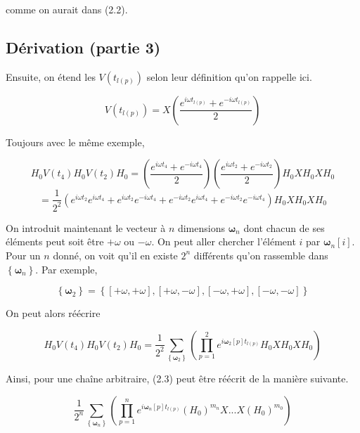 comme on aurait dans (2.2).

\subsection{Dérivation (partie 3)}
Ensuite, on étend les $V(t_{l(p)})$ selon leur définition qu'on rappelle ici.

\begin{equation*}
    V(t_{l(p)}) = X\left(\frac{e^{i\omega t_{l(p)}} + e^{-i\omega t_{l(p)}}}{2}\right)
\end{equation*}

Toujours avec le même exemple,

\begin{equation*}
    H_0V(t_4)H_0V(t_2)H_0 = \left(\frac{e^{i\omega t_4} + e^{-i\omega t_4}}{2}\right)\left(\frac{e^{i\omega t_2} + e^{-i\omega t_2}}{2}\right)H_0XH_0XH_0 
\end{equation*}
\begin{equation*}
    = \frac{1}{2^2}\left(e^{i\omega t_2}e^{i\omega t_4} + e^{i\omega t_2}e^{-i\omega t_4} + e^{-i\omega t_2}e^{i\omega t_4} + e^{-i\omega t_2}e^{-i\omega t_4}\right)H_0XH_0XH_0
\end{equation*}

On introduit maintenant le vecteur à $n$ dimensions $\boldsymbol{\omega}_n$ dont chacun de ses éléments peut soit être $+\omega$ ou $-\omega$. On peut aller chercher l'élément $i$ par $\boldsymbol{\omega}_n[i]$. Pour un $n$ donné, on voit qu'il en existe $2^n$ différents qu'on rassemble dans $\left\{\boldsymbol{\omega}_n\right\}$. Par exemple, 

\begin{equation*}
    \left\{\boldsymbol{\omega}_2\right\} = \left\{\left[+\omega, +\omega\right], \left[+\omega, -\omega\right], \left[-\omega, +\omega\right], \left[-\omega, -\omega\right]\right\}    
\end{equation*}

On peut alors réécrire

\begin{equation*}
    H_0V(t_4)H_0V(t_2)H_0 = \frac{1}{2^2}\sum_{\left\{\boldsymbol{\omega}_2\right\}}\left(\prod_{p=1}^{2}e^{i\boldsymbol{\omega}_2[p]t_{l(p)}} H_0XH_0XH_0\right)
\end{equation*}

Ainsi, pour une chaîne arbitraire, (2.3) peut être réécrit de la manière suivante.

\begin{equation}
    \frac{1}{2^n}\sum_{\left\{\boldsymbol{\omega}_n\right\}}\left(\prod_{p=1}^{n}e^{i\boldsymbol{\omega}_n[p]t_{l(p)}} (H_0)^{m_n}X ... X(H_0)^{m_0}\right)
\end{equation}

